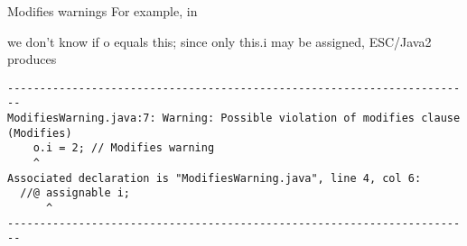 \documentclass[
pdf,
nocolorBG,
slideColor,
cok,
]{prosper}
\begin{document}
\begin{slide}{Modifies warnings}
\vspace*{-9ex}
For example, in 

\begin{figure*}
\tiny

\end{figure*}
we don't know if {\blue o} equals {\blue this}; since only {\blue this.i} may be assigned,
 ESC/Java2 produces
\tiny
\begin{verbatim}
------------------------------------------------------------------------
ModifiesWarning.java:7: Warning: Possible violation of modifies clause (Modifies)
    o.i = 2; // Modifies warning
    ^
Associated declaration is "ModifiesWarning.java", line 4, col 6:
  //@ assignable i;
      ^
------------------------------------------------------------------------
\end{verbatim}

\end{slide}

\end{document}
